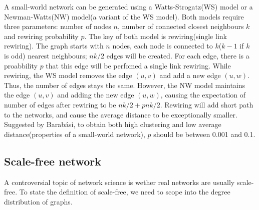 \documentclass[12pt]{article}
\begin{document}
A small-world network can be generated using a Watts-Strogatz(WS) model\cite{wsmodel} or a Newman-Watts(NW) model(a variant of the WS model)\cite{nwmodel}. Both models require three parameters: number of nodes $n$, number of connected closest neighbours $k$ and rewiring probability $p$. The key of both model is rewiring(single link rewiring). The graph starts with $n$ nodes, each node is connected to $k$($k-1$ if $k$ is odd) nearest neighbours; $nk/2$ edges will be created. For each edge, there is a proabbility $p$ that this edge will be perfomed a single link rewiring. While rewiring, the WS model removes the edge $(u,v)$ and add a new edge $(u,w)$. Thus, the number of edges stays the same. However, the NW model maintains the edge $(u,v)$ and adding the new edge $(u,w)$, causing the expectation of number of edges after rewiring to be $nk/2+pnk/2$. Rewiring will add short path to the networks, and cause the average distance to be exceptionally smaller. Suggested by Barabási\cite{barabási2016network}, to obtain both high clustering and low average distance(properties of a small-world network), $p$ should be between 0.001 and 0.1.\\


\subsection{Scale-free network}
A controversial topic of network science is wether real networks are usually scale-free\cite{broido_clauset_2019}\cite{albert1999diameter}. To state the definition of scale-free, we need to scope into the degree distribution of graphs.\\
\end{document}
